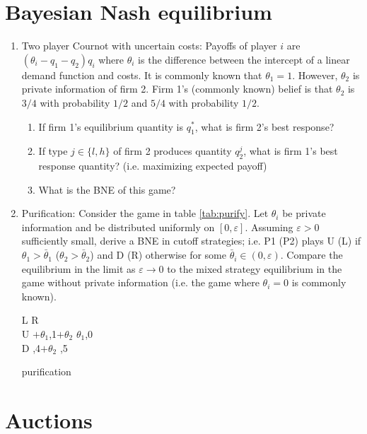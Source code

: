 \documentclass[a4paper,12pt]{article}
\begin{document}
\section{Bayesian Nash equilibrium}
\label{sec:Bayes-nash-eq}
\begin{enumerate}
\item Two player Cournot with uncertain costs: Payoffs of player $i$ are $(\theta _i-q_1-q_2)q_i$ where $\theta _i$ is the difference between the intercept of a linear demand function and costs. It is commonly known that $\theta _1=1$. However, $\theta _2$ is private information of firm 2. Firm 1's (commonly known) belief is that $\theta _2$ is $3/4$ with probability $1/2$ and $5/4$ with probability $1/2$.
  \begin{enumerate}
  \item If firm 1's equilibrium quantity is $q_1^*$, what is firm 2's best response?
  \item If type $j\in\{l,h\}$ of firm 2 produces quantity $q_2^j$, what is firm 1's best response quantity? (i.e. maximizing expected payoff)
    \item What is the BNE of this game?
  \end{enumerate}
\item Purification: Consider the game in table \ref{tab:purify}. Let $\theta _i$ be private information and be distributed uniformly on $[0 ,\varepsilon ]$. Assuming $\varepsilon >0$ sufficiently small, derive a BNE in cutoff strategies; i.e. P1 (P2) plays U (L) if $\theta _1>\bar{\theta }_1$ ($\theta _2>\bar{\theta }_2$) and D (R) otherwise for some $\bar \theta_i\in(0,{\varepsilon })$. Compare the equilibrium in the limit as $\varepsilon \rightarrow 0$ to the mixed strategy equilibrium in the game without private information (i.e. the game where $\theta _i=0$ is commonly known). 
     \begin{table}[h]
\centering
 \begin{game}{2}{2}
       \> L  \>R\\ %
U   $+\theta_1$,1$+\theta _2$    \> $\theta_1$,0   \\
D  ,4$+\theta _2$    ,5
\end{game}  
\caption{purification}
\label{tab:purify}
\end{table}
\end{enumerate}

\section{Auctions}
\label{sec:auctions}
\end{document}
